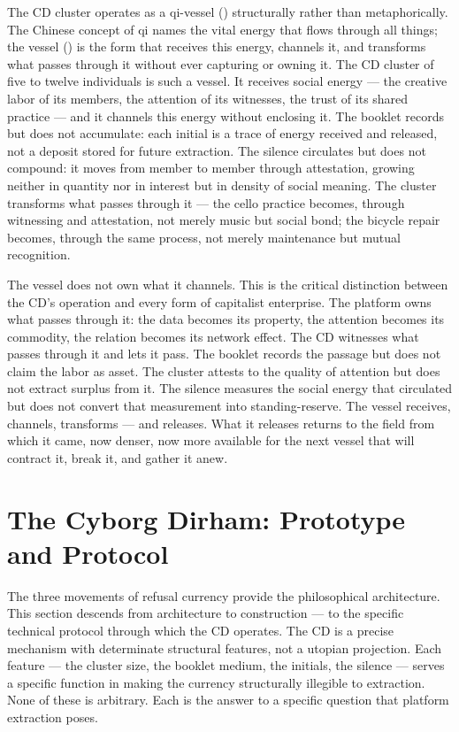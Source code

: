 The CD cluster operates as a qi-vessel () structurally rather than metaphorically. The Chinese concept of qi names the vital energy that flows through all things; the vessel () is the form that receives this energy, channels it, and transforms what passes through it without ever capturing or owning it. The CD cluster of five to twelve individuals is such a vessel. It receives social energy — the creative labor of its members, the attention of its witnesses, the trust of its shared practice — and it channels this energy without enclosing it. The booklet records but does not accumulate: each initial is a trace of energy received and released, not a deposit stored for future extraction. The silence circulates but does not compound: it moves from member to member through attestation, growing neither in quantity nor in interest but in density of social meaning. The cluster transforms what passes through it — the cello practice becomes, through witnessing and attestation, not merely music but social bond; the bicycle repair becomes, through the same process, not merely maintenance but mutual recognition.

The vessel does not own what it channels. This is the critical distinction between the CD's operation and every form of capitalist enterprise. The platform owns what passes through it: the data becomes its property, the attention becomes its commodity, the relation becomes its network effect. The CD witnesses what passes through it and lets it pass. The booklet records the passage but does not claim the labor as asset. The cluster attests to the quality of attention but does not extract surplus from it. The silence measures the social energy that circulated but does not convert that measurement into standing-reserve. The vessel receives, channels, transforms — and releases. What it releases returns to the field from which it came, now denser, now more available for the next vessel that will contract it, break it, and gather it anew.

\section{The Cyborg Dirham: Prototype and Protocol}

The three movements of refusal currency provide the philosophical architecture. This section descends from architecture to construction — to the specific technical protocol through which the CD operates. The CD is a precise mechanism with determinate structural features, not a utopian projection. Each feature — the cluster size, the booklet medium, the initials, the silence — serves a specific function in making the currency structurally illegible to extraction. None of these is arbitrary. Each is the answer to a specific question that platform extraction poses.

